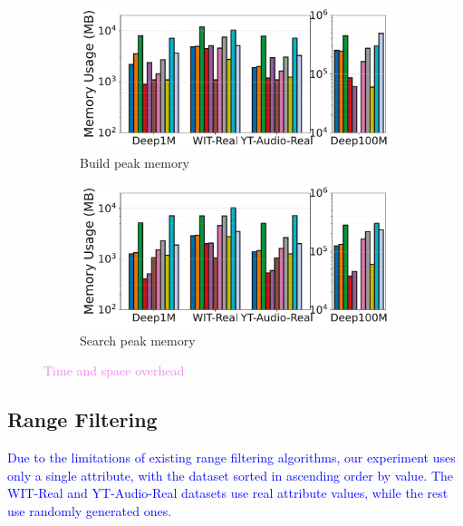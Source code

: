 \documentclass[sigconf, nonacm]{acmart}
\begin{document}
\begin{figure}[t]
\begin{subfigure}[t]{0.495\columnwidth}
			\includegraphics[width=\linewidth]{figures/indexData/rangeFilter_memory_mb_comparison_query.pdf}
			\caption{\footnotesize Build peak memory}
			\label{fig:rangeFilter_build_memory_mb}
		\end{subfigure}
		\hfill
		\begin{subfigure}[t]{0.495\columnwidth}
			\centering
			\includegraphics[width=\linewidth]{figures/searchMem/range_memory_comparison.pdf}
			\caption{\footnotesize Search peak memory}
			\label{fig:rangeFilter_search_memory_mb}
		\end{subfigure}
		
		\caption{\textcolor{violet}{Time and space overhead}}
		\label{fig:rangeFilter_build_index_comparison}
	\end{figure}
	\subsection{Range Filtering}
	\textcolor{blue}{Due to the limitations of existing range filtering algorithms, our experiment uses only a single attribute, with the dataset sorted in ascending order by value. The WIT-Real and YT-Audio-Real datasets use real attribute values, while the rest use randomly generated ones. }
\end{document}
